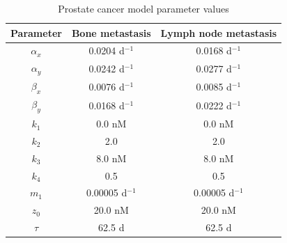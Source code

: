 \begin{table}[h]
\caption{Prostate cancer model parameter values\label{prostate}}
\centering
\begin{tabular}{c|c|c}
\hline
Parameter  & Bone metastasis & Lymph node metastasis  \\\hline
$\alpha_x$ & 0.0204 d$^{-1}$ & 0.0168 d$^{-1}$  \\
$\alpha_y$ & 0.0242 d$^{-1}$ & 0.0277 d$^{-1}$  \\
$\beta_x$  & 0.0076 d$^{-1}$ & 0.0085 d$^{-1}$  \\
$\beta_y$  & 0.0168 d$^{-1}$ & 0.0222 d$^{-1}$  \\
$k_1$     & 0.0 nM & 0.0 nM \\
$k_2$     & 2.0 & 2.0  \\
$k_3$     & 8.0 nM & 8.0 nM \\
$k_4$     & 0.5 & 0.5  \\
$m_1$     & 0.00005 d$^{-1}$ & 0.00005 d$^{-1}$  \\
$z_0$     & 20.0 nM & 20.0 nM  \\
$\tau$     & 62.5 d & 62.5 d \\
\hline
\end{tabular}
\end{table}
